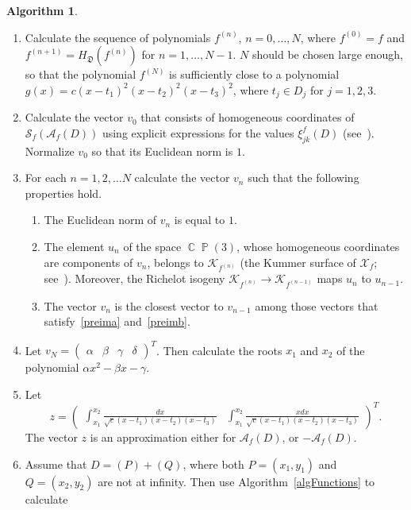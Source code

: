 \documentclass{amsart}
\numberwithin{equation}{section}
\theoremstyle{definition}
\newtheorem{algo}{Algorithm}[section]
\theoremstyle{remark}
\DeclareMathOperator{\CC}{\mathbb C}
\DeclareMathOperator{\PP}{\mathbb P}
\begin{document}
	\begin{algo}\label{algAbelMap}
		\begin{enumerate}
			\item Calculate the sequence of polynomials $f^{(n)}$, $n = 0, \dots, N$, where $f^{(0)} = f$ and $f^{(n+1)} = H_{\mathfrak D}(f^{(n)})$ for $n = 1, \dots, N-1$. $N$ should be chosen large enough, so that the polynomial $f^{(N)}$ is sufficiently close to a polynomial $g(x) = c(x - t_1)^2(x - t_2)^2(x - t_3)^2$, where $t_j \in D_j$ for $j = 1,2,3$.
			\item Calculate the vector $v_0$ that consists of homogeneous coordinates of $\mathscr S_f(\mathscr A_f(D))$ using explicit expressions for the values $\xi_{jk}^f(D)$ (see~\cite[Section~2.2]{KleinianWeight2}). Normalize $v_0$ so that its Euclidean norm is $1$.
			\item\label{algAbelMapStepPreimage} For each $n = 1,2,\dots N$ calculate the vector $v_n$ such that the following properties hold.
			\begin{enumerate}[label=(\alph*)]
				\item\label{preima} The Euclidean norm of $v_n$ is equal to $1$.
				\item\label{preimb} The element $u_n$ of the space $\CC\PP(3)$, whose homogeneous coordinates are components of $v_n$, belongs to $\mathcal K_{f^{(n)}}$ (the Kummer surface of $\mathcal X_f$; see~\cite[Section~2.3]{RichelotExpression}). Moreover, the Richelot isogeny $\mathcal K_{f^{(n)}} \to \mathcal K_{f^{(n-1)}}$ maps $u_n$ to $u_{n-1}$.
				\item\label{preimc} The vector $v_n$ is the closest vector to $v_{n-1}$ among those vectors that satisfy~\ref{preima} and~\ref{preimb}.
			\end{enumerate}
			\item Let $v_N = \begin{pmatrix}
				\alpha & \beta & \gamma & \delta
			\end{pmatrix}^T$. Then calculate the roots $x_1$ and $x_2$ of the polynomial $\alpha x^2 - \beta x - \gamma$. 
			\item Let
			\[z = \begin{pmatrix}
				\displaystyle\int_{x_1}^{x_2} \frac{dx}{\sqrt{c}(x - t_1)(x- t_2)(x - t_3)} & \displaystyle\int_{x_1}^{x_2} \frac{xdx}{\sqrt{c}(x - t_1)(x- t_2)(x - t_3)}
			\end{pmatrix}^T.\]
			The vector $z$ is an approximation either for $\mathscr A_f(D)$, or $-\mathscr A_f(D)$.  
			\item[{\crtcrossreflabel{(\arabic{enumi}a)}[algStepSignFinite]}] Assume that $D = (P) + (Q)$, where both $P = (x_1,y_1)$ and $Q = (x_2,y_2)$ are not at infinity. Then use Algorithm~\ref{algFunctions} to calculate

\end{enumerate}
\end{algo}
\end{document}
